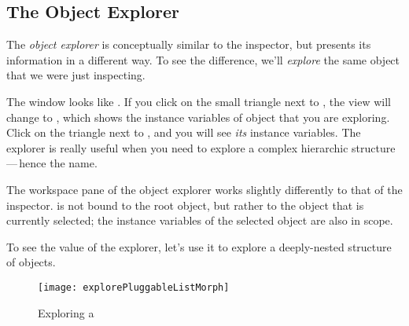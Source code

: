 \documentclass[a4paper,10pt,twoside]{book}
\begin{document}
\subsection{The Object Explorer}

The \emph{object explorer} is conceptually similar to the inspector, but presents its information in a different way.
To see the difference, we'll \emph{explore} the same object that we were just inspecting.

The  window looks like .
If you click on the small triangle next to , the view will change to , which shows the instance variables of object that you are exploring.
Click on the triangle next to , and you will see \emph{its} instance variables.  
The explorer is really useful when you need to explore a complex hierarchic structure\,---\,hence the name.

The workspace pane of the object explorer works slightly differently to that of the inspector.
 is not bound to the root object, but rather to the object that is currently selected; the instance variables of the selected object are also in scope.
{}

To see the value of the explorer, let's use it to explore a deeply-nested structure of objects.


\begin{figure}[tbp]
	\begin{center}
		\texttt{[image: explorePluggableListMorph]}
	\end{center}
	\caption{Exploring a }
	\label{fig:explorePluggableListMorph}
\end{figure}
\end{document}
